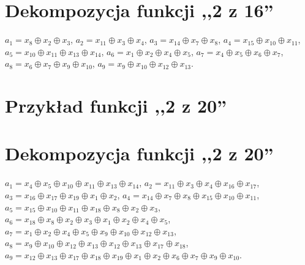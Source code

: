 \section*{Dekompozycja funkcji ,,2 z 16''}
\label{file:2outof16.txt}
\noindent
$a_1 = x_8 \oplus x_2 \oplus x_3$, \newline
$a_2 = x_{11} \oplus x_3 \oplus x_4$, \newline
$a_3 = x_{14} \oplus x_7 \oplus x_8$, \newline
$a_4 = x_{15} \oplus x_{10} \oplus x_{11}$, \newline
$a_5 = x_{10} \oplus x_{11} \oplus x_{13} \oplus x_{14}$, \newline
$a_6 = x_1 \oplus x_2 \oplus x_4 \oplus x_5$, \newline
$a_7 = x_4 \oplus x_5 \oplus x_6 \oplus x_7$, \newline
$a_8 = x_6 \oplus x_7 \oplus x_9 \oplus x_{10}$, \newline
$a_9 = x_9 \oplus x_{10} \oplus x_{12} \oplus x_{13}$. \newline

\clearpage

\section*{Przykład funkcji ,,2 z 20''}
\label{file:2outof20.pla}

\clearpage

\section*{Dekompozycja funkcji ,,2 z 20''}
\label{file:2outof20.txt}
\noindent
$a_1 = x_{4} \oplus x_{5} \oplus x_{10} \oplus x_{11} \oplus x_{13} \oplus x_{14}$, \newline
$a_2 = x_{11} \oplus x_{3} \oplus x_{4} \oplus x_{16} \oplus x_{17}$, \newline
$a_3 = x_{16} \oplus x_{17} \oplus x_{19} \oplus x_{1} \oplus x_{2}$, \newline
$a_4 = x_{14} \oplus x_{7} \oplus x_{8} \oplus x_{15} \oplus x_{10} \oplus x_{11}$, \newline
$a_5 = x_{15} \oplus x_{10} \oplus x_{11} \oplus x_{18} \oplus x_{8} \oplus x_{2} \oplus x_{3}$, \newline
$a_6 = x_{18} \oplus x_{8} \oplus x_{2} \oplus x_{3} \oplus x_{1} \oplus x_{2} \oplus x_{4} \oplus x_{5}$, \newline
$a_7 = x_{1} \oplus x_{2} \oplus x_{4} \oplus x_{5} \oplus x_{9} \oplus x_{10} \oplus x_{12} \oplus x_{13}$, \newline
$a_8 = x_{9} \oplus x_{10} \oplus x_{12} \oplus x_{13} \oplus x_{12} \oplus x_{13} \oplus x_{17} \oplus x_{18}$, \newline
$a_9 = x_{12} \oplus x_{13} \oplus x_{17} \oplus x_{18} \oplus x_{19} \oplus x_{1} \oplus x_{2} \oplus x_{6} \oplus x_{7} \oplus x_{9} \oplus x_{10}$. \newline

\clearpage